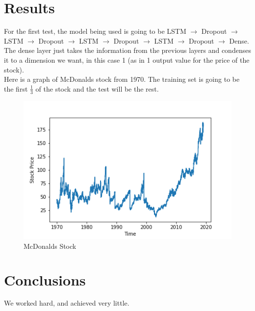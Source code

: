 \documentclass[12pt]{article}
\begin{document}
\section{Results}
For the first test, the model being used is going to be LSTM $\rightarrow$ Dropout $\rightarrow$ LSTM $\rightarrow$ Dropout $\rightarrow$ LSTM $\rightarrow$ Dropout $\rightarrow$ LSTM $\rightarrow$ Dropout $\rightarrow$ Dense. The dense layer just takes the information from the previous layers and condenses it to a dimension we want, in this case 1 (as in 1 output value for the price of the stock). \\
Here is a graph of McDonalds stock from 1970. The training set is going to be the first $\frac{1}{3}$ of the stock and the test will be the rest. 
\begin{figure}[H]
  \includegraphics[width=\linewidth]{images/graph1.png}
  \caption{McDonalds Stock}
\end{figure}

\section{Conclusions}\label{conclusions}
We worked hard, and achieved very little.




\end{document}
